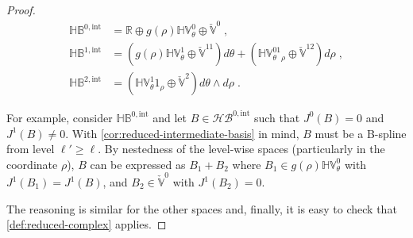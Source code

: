 \documentclass[10pt,a4paper]{amsart}
\newcommand{\RR}{{\mathbb{R}}}
\newcommand{\basis}[1]{\mathcal{#1}}
\newcommand{\bsp}{B}
\newcommand{\cU}{\theta}
\newcommand{\cV}{\rho}
\newcommand{\dcU}{\mathit{d\cU}}
\newcommand{\dcV}{\mathit{d\cV}}
\newcommand{\hBasis}[1]{\mathit{\basis{H}\basis{#1}}}
\newcommand{\hSpace}[1]{\mathit{\vSpace{H}\vSpace{#1}}}
\newcommand{\jet}[2]{J^{#1}\left(#2\right)}
\newcommand{\tint}{\mathrm{int}}
\newcommand{\vSpace}[1]{\mathbb{#1}}
\begin{document}
\begin{proof}
    \begin{equation*}
        \begin{split}
            \hSpace{\bsp}^{0,\tint} &= \RR \oplus g(\cV)\hSpace{V}_\cU^0 \oplus \check{\vSpace{V}}^0\;,\\
            \hSpace{\bsp}^{1,\tint} &= \left(g(\cV)\hSpace{V}_\cU^1 \oplus \check{\vSpace{V}}^{11}\right)\dcU
                            + \left(\hSpace{V}_\cU^01_\cV \oplus \check{\vSpace{V}}^{12}\right)\dcV\;,\\
            \hSpace{\bsp}^{2,\tint} &= \left(\hSpace{V}_\cU^1 1_\cV \oplus \check{\vSpace{V}}^2\right)\dcU \wedge \dcV\;.
        \end{split}
    \end{equation*}
    
    For example, consider $\hSpace{\bsp}^{0,\tint}$ and let $B \in \hBasis{\bsp}^{0,\tint}$ such that $\jet{0}{B} = 0$ and $\jet{1}{B} \neq 0$.
    With \cref{cor:reduced-intermediate-basis} in mind, $B$ must be a B-spline from level $\ell' \geq \ell$.
    By nestedness of the level-wise spaces (particularly in the coordinate $\cV$), $B$ can be expressed as $B_1 + B_2$ where $B_1 \in g(\cV)\hSpace{V}_\cU^0$ with $\jet{1}{B_1} = \jet{1}{B}$, and $B_2 \in \check{\vSpace{V}}^0$ with $\jet{1}{B_2} = 0$.

    The reasoning is similar for the other spaces and, finally, it is easy to check that \cref{def:reduced-complex} applies.
\end{proof}
\end{document}
